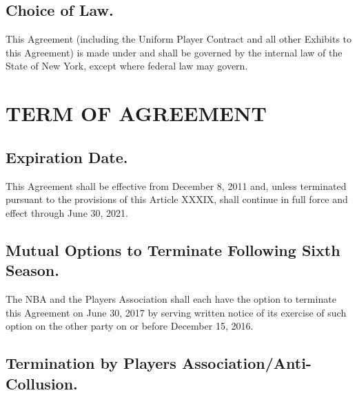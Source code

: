 \documentclass[
]{book}
\begin{document}
\hypertarget{choice-of-law.}{%
\section{Choice of Law.}\label{choice-of-law.}}

This Agreement (including the Uniform Player Contract and all other Exhibits to this Agreement) is made under and shall be governed by the internal law of the State of New York, except where federal law may govern.

\hypertarget{term-of-agreement}{%
\chapter{TERM OF AGREEMENT}\label{term-of-agreement}}

\hypertarget{expiration-date.}{%
\section{Expiration Date.}\label{expiration-date.}}

This Agreement shall be effective from December 8, 2011 and, unless terminated pursuant to the provisions of this Article XXXIX, shall continue in full force and effect through June 30, 2021.

\hypertarget{mutual-options-to-terminate-following-sixth-season.}{%
\section{Mutual Options to Terminate Following Sixth Season.}\label{mutual-options-to-terminate-following-sixth-season.}}

The NBA and the Players Association shall each have the option to terminate this Agreement on June 30, 2017 by serving written notice of its exercise of such option on the other party on or before December 15, 2016.

\hypertarget{termination-by-players-associationanti-collusion.}{%
\section{Termination by Players Association/Anti-Collusion.}\label{termination-by-players-associationanti-collusion.}}
\end{document}
